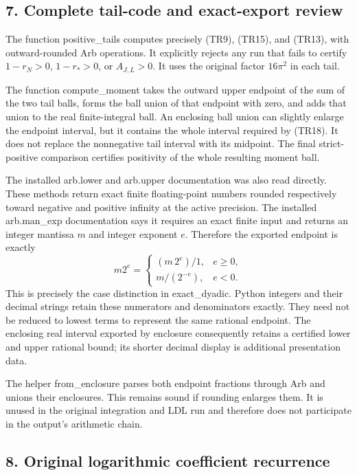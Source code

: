 \subsection{7. Complete tail-code and exact-export review}\label{C47stage:TR:complete-tail-code-and-exact-export-review}

The function positive\_tails computes precisely (TR9), (TR15), and (TR13), with outward-rounded Arb operations. It explicitly rejects any run that fails to certify \(1-r_N>0\), \(1-r_*>0\), or \(A_{J,L}>0\). It uses the original factor \(16\pi^2\) in each tail.

The function compute\_moment takes the outward upper endpoint of the sum of the two tail balls, forms the ball union of that endpoint with zero, and adds that union to the real finite-integral ball. An enclosing ball union can slightly enlarge the endpoint interval, but it contains the whole interval required by (TR18). It does not replace the nonnegative tail interval with its midpoint. The final strict-positive comparison certifies positivity of the whole resulting moment ball.

The installed arb.lower and arb.upper documentation was also read directly. These methods return exact finite floating-point numbers rounded respectively toward negative and positive infinity at the active precision. The installed arb.man\_exp documentation says it requires an exact finite input and returns an integer mantissa \(m\) and integer exponent \(e\). Therefore the exported endpoint is exactly \[
 m2^e=
 \begin{cases}
 (m\,2^e)/1,&e\geq0,\\
 m/(2^{-e}),&e<0.
 \end{cases}
 \tag{TR25}
\] This is precisely the case distinction in exact\_dyadic. Python integers and their decimal strings retain these numerators and denominators exactly. They need not be reduced to lowest terms to represent the same rational endpoint. The enclosing real interval exported by enclosure consequently retains a certified lower and upper rational bound; its shorter decimal display is additional presentation data.

The helper from\_enclosure parses both endpoint fractions through Arb and unions their enclosures. This remains sound if rounding enlarges them. It is unused in the original integration and LDL run and therefore does not participate in the output's arithmetic chain.

\subsection{8. Original logarithmic coefficient recurrence}\label{C47stage:TR:original-logarithmic-coefficient-recurrence}

